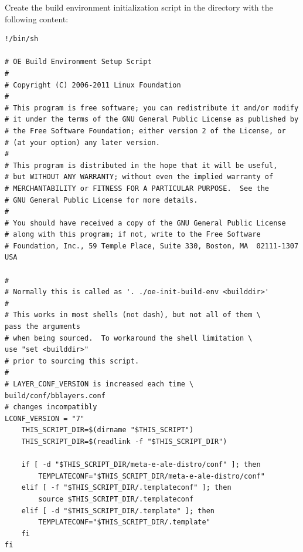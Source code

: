\documentclass[a4paper,12pt,obeyspaces,spaces,hyphens]{article}
\newcommand{\code}[1]
{\path{#1}}
\begin{document}
Create the build environment initialization script \code{init-build-env} in the \code{yocto-e-ale} directory with the following content:

\begin{tcolorbox}[enhanced jigsaw,colback=bg,boxrule=0pt,arc=0pt]
\begin{verbatim}
!/bin/sh

# OE Build Environment Setup Script
#
# Copyright (C) 2006-2011 Linux Foundation
#
# This program is free software; you can redistribute it and/or modify
# it under the terms of the GNU General Public License as published by
# the Free Software Foundation; either version 2 of the License, or
# (at your option) any later version.
#
# This program is distributed in the hope that it will be useful,
# but WITHOUT ANY WARRANTY; without even the implied warranty of
# MERCHANTABILITY or FITNESS FOR A PARTICULAR PURPOSE.  See the
# GNU General Public License for more details.
#
# You should have received a copy of the GNU General Public License
# along with this program; if not, write to the Free Software
# Foundation, Inc., 59 Temple Place, Suite 330, Boston, MA  02111-1307  USA

#
# Normally this is called as '. ./oe-init-build-env <builddir>'
#
# This works in most shells (not dash), but not all of them \
pass the arguments
# when being sourced.  To workaround the shell limitation \
use "set <builddir>"
# prior to sourcing this script.
#
# LAYER_CONF_VERSION is increased each time \
build/conf/bblayers.conf
# changes incompatibly
LCONF_VERSION = "7"
    THIS_SCRIPT_DIR=$(dirname "$THIS_SCRIPT")
    THIS_SCRIPT_DIR=$(readlink -f "$THIS_SCRIPT_DIR")

    if [ -d "$THIS_SCRIPT_DIR/meta-e-ale-distro/conf" ]; then
        TEMPLATECONF="$THIS_SCRIPT_DIR/meta-e-ale-distro/conf"
    elif [ -f "$THIS_SCRIPT_DIR/.templateconf" ]; then
        source $THIS_SCRIPT_DIR/.templateconf
    elif [ -d "$THIS_SCRIPT_DIR/.template" ]; then
        TEMPLATECONF="$THIS_SCRIPT_DIR/.template"
    fi
fi
\end{verbatim}
\end{tcolorbox}
\end{document}

